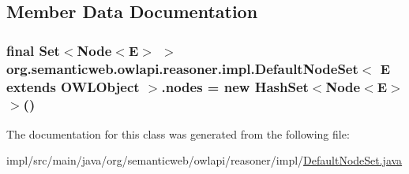 \subsection{Member Data Documentation}
\hypertarget{classorg_1_1semanticweb_1_1owlapi_1_1reasoner_1_1impl_1_1_default_node_set_3_01_e_01extends_01_o_w_l_object_01_4_ab355a8f9ba4d122cad825fd36214893e}{
\subsubsection[{nodes}]{\setlength{\rightskip}{0pt plus 5cm}final Set$<$Node$<$E$>$ $>$ org.\-semanticweb.\-owlapi.\-reasoner.\-impl.\-Default\-Node\-Set$<$ E extends {\bf O\-W\-L\-Object} $>$.nodes = new Hash\-Set$<$Node$<$E$>$$>$()\hspace{0.3cm}{\ttfamily [private]}}}\label{classorg_1_1semanticweb_1_1owlapi_1_1reasoner_1_1impl_1_1_default_node_set_3_01_e_01extends_01_o_w_l_object_01_4_ab355a8f9ba4d122cad825fd36214893e}


The documentation for this class was generated from the following file\-:\begin{DoxyCompactItemize}
\item 
impl/src/main/java/org/semanticweb/owlapi/reasoner/impl/\hyperlink{_default_node_set_8java}{Default\-Node\-Set.\-java}\end{DoxyCompactItemize}
